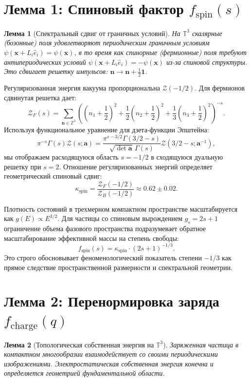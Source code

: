 \documentclass[12pt,a4paper]{article}
\newtheorem{lemma}{Лемма}
\begin{document}
\section{Лемма 1: Спиновый фактор $f_{\text{spin}}(s)$}
\begin{lemma}[Спектральный сдвиг от граничных условий]
На $\mathbb{T}^3$ скалярные (бозонные) поля удовлетворяют периодическим граничным условиям $\psi(\mathbf{x}+L_i\hat{e}_i) = \psi(\mathbf{x})$, в то время как спинорные (фермионные) поля требуют антипериодических условий $\psi(\mathbf{x}+L_i\hat{e}_i) = -\psi(\mathbf{x})$ из-за спиновой структуры. Это сдвигает решетку импульсов: $\mathbf{n} \to \mathbf{n} + \frac{1}{2}\mathbf{1}$.
\end{lemma}

Регуляризованная энергия вакуума пропорциональна $\mathcal{Z}(-1/2)$. Для фермионов сдвинутая решетка дает:
\begin{equation}
    \mathcal{Z}_F(s) = \sum_{\mathbf{n} \in \mathbb{Z}^3} \left( \left(n_1+\frac{1}{2}\right)^2 + \frac{1}{2}\left(n_2+\frac{1}{2}\right)^2 + \frac{1}{3}\left(n_3+\frac{1}{2}\right)^2 \right)^{-s}.
\end{equation}
Используя функциональное уравнение для дзета-функции Эпштейна:
\begin{equation}
    \pi^{-s}\Gamma(s)\mathcal{Z}(s;\mathbf{a}) = \frac{\pi^{s-3/2}\Gamma(3/2-s)}{\sqrt{\det \mathbf{a}}\,\Gamma(s)} \mathcal{Z}(3/2-s;\mathbf{a}^{-1}),
\end{equation}
мы отображаем расходящуюся область $s=-1/2$ в сходящуюся дуальную решетку при $s=2$. Отношение регуляризованных энергий определяет геометрический спиновый сдвиг:
\begin{equation}
    \kappa_{\text{spin}} = \frac{\mathcal{Z}_F(-1/2)}{\mathcal{Z}_B(-1/2)} \approx 0.62 \pm 0.02.
\end{equation}

Плотность состояний в трехмерном компактном пространстве масштабируется как $g(E) \propto E^{3/2}$. Для частицы со спиновым вырождением $g_s = 2s+1$ ограничение объема фазового пространства подразумевает обратное масштабирование эффективной массы на степень свободы:
\begin{equation}
    f_{\text{spin}}(s) = \kappa_{\text{spin}} \cdot (2s+1)^{-1/3}.
\end{equation}
Это строго обосновывает феноменологический показатель степени $-1/3$ как прямое следствие пространственной размерности и спектральной геометрии.

\section{Лемма 2: Перенормировка заряда $f_{\text{charge}}(q)$}
\begin{lemma}[Топологическая собственная энергия на $\mathbb{T}^3$]
Заряженная частица в компактном многообразии взаимодействует со своими периодическими изображениями. Электростатическая собственная энергия конечна и определяется геометрией фундаментальной области.
\end{lemma}
\end{document}
